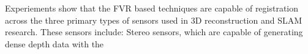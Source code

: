 
Experiements show that the FVR based techniques are capable of registration across the three primary types of sensors used in 3D reconstruction and SLAM research. These sensors include: Stereo sensors, which are capable of generating dense depth data with the 